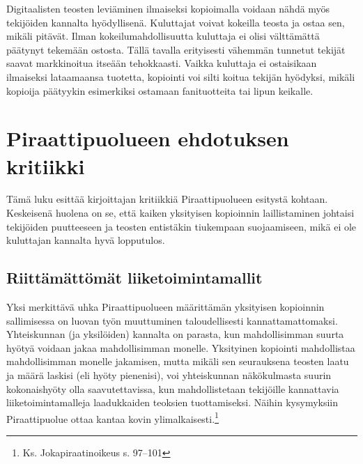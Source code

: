 \documentclass[titlepage,12pt]{article}
\begin{document}
Digitaalisten teosten leviäminen ilmaiseksi kopioimalla voidaan nähdä
myös tekijöiden kannalta hyödyllisenä.  Kuluttajat voivat kokeilla
teosta ja ostaa sen, mikäli pitävät.  Ilman kokeilumahdollisuutta
kuluttaja ei olisi välttämättä päätynyt tekemään ostosta.  Tällä
tavalla erityisesti vähemmän tunnetut tekijät saavat markkinoitua
itseään tehokkaasti.  Vaikka kuluttaja ei ostaisikaan ilmaiseksi
lataamaansa tuotetta, kopiointi voi silti koitua tekijän hyödyksi,
mikäli kopioija päätyykin esimerkiksi ostamaan fanituotteita tai lipun
keikalle.


\section{Piraattipuolueen ehdotuksen kritiikki}

Tämä luku esittää kirjoittajan kritiikkiä Piraattipuolueen esitystä
kohtaan.  Keskeisenä huolena on se, että kaiken yksityisen kopioinnin
laillistaminen johtaisi tekijöiden puutteeseen ja teosten entistäkin
tiukempaan suojaamiseen, mikä ei ole kuluttajan kannalta hyvä
lopputulos.

\subsection{Riittämättömät liiketoimintamallit}

Yksi merkittävä uhka Piraattipuolueen määrittämän yksityisen
kopioinnin sallimisessa on luovan työn muuttuminen taloudellisesti
kannattamattomaksi.  Yhteiskunnan (ja yksilöiden) kannalta on parasta,
kun mahdollisimman suurta hyötyä voidaan jakaa mahdollisimman monelle.
Yksityinen kopiointi mahdollistaa mahdollisimman monelle jakamisen,
mutta mikäli sen seurauksena teosten laatu ja määrä laskisi (eli hyöty
pienenisi), voi yhteiskunnan näkökulmasta suurin kokonaishyöty olla
saavutettavissa, kun mahdollistetaan tekijöille kannattavia
liiketoimintamalleja laadukkaiden teoksien tuottamiseksi.  Näihin
kysymyksiin Piraattipuolue ottaa kantaa kovin
ylimalkaisesti.\footnote{Ks. Jokapiraatinoikeus s. 97--101}


\end{document}
